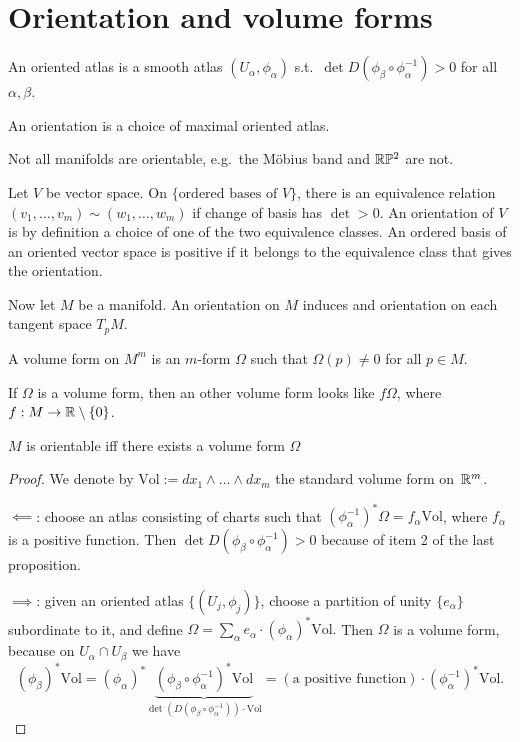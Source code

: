 \section{Orientation and volume forms}
\begin{definition}
    An oriented atlas is a smooth atlas $(U_{\alpha},\phi_{\alpha})$ s.t.\ $\det D(\phi_\beta  \circ  \phi_\alpha^{-1}) > 0$ for all $\alpha,\beta$.
\end{definition}
\begin{definition}[Orientation]
    An orientation is a choice of maximal oriented atlas.
\end{definition}
\begin{remark}
    Not all manifolds are orientable, e.g.\ the Möbius band and $\mathbb{R}\mathbb{P}^2$ are not.
\end{remark}
\begin{remark}
Let $V$ be vector space.
On $\{\text{ordered bases of $V$}\}$, there is an equivalence relation $(v_1, \ldots, v_m) \sim (w_1, \ldots, w_m)$ if change of basis has $\det > 0$.
An orientation of  $V$ is by definition a choice of one of the two equivalence classes. 
An ordered basis of an oriented vector space is positive if it belongs to the equivalence class that gives the orientation.


Now let $M$ be a manifold. An orientation on $M$ induces and orientation on each tangent space $T_pM$.
\end{remark}
\begin{definition}
    A volume form on $M^{m}$ is an $m$-form $\Omega$ such that  $\Omega (p) \neq 0$ for all  $p \in  M$.
\end{definition}
\begin{remark}
    If $\Omega$ is a volume form, then an other volume form looks like $f \Omega$, where $f : M \to  \mathbb{R}\setminus \{0\}$.
\end{remark}

\begin{prop}
    $M$ is orientable iff there exists a volume form $\Omega$
\end{prop}
\begin{proof}
    We denote by $\text{Vol}:=dx_1 \wedge \ldots \wedge dx_m$ the standard volume form on~$\mathbb{R}^m$.

    $\impliedby$: choose an atlas consisting of charts such that $(\phi^{-1}_\alpha)^{*}\Omega = f_\alpha \text{Vol}$, where $f_\alpha $ is a positive function.
    Then $\det D(\phi_\beta  \circ  \phi_\alpha^{-1}) > 0$ because of item 2 of the last proposition.
    
      $\implies$: given an oriented atlas  $\{(U_{j},\phi_{j})\}$, choose a partition of unity $\{e_{\alpha}\}$ subordinate to it, and define 
      $\Omega = \sum_{\alpha} e_\alpha \cdot(\phi_\alpha)^* \text{Vol}.$
 Then $\Omega$ is a volume form, because on $U_\alpha\cap U_\beta$ we have
 $$ (\phi_\beta)^* \text{Vol}    =(\phi_\alpha)^*\underbrace{(\phi_\beta\circ \phi_\alpha^{-1})^* \text{Vol}}_{\det (D(\phi_\beta\circ \phi_\alpha^{-1}))\cdot \text{Vol}}=(\text{a positive function})\cdot (\phi_\alpha^{-1})^*\text{Vol}.
 $$
\end{proof}

